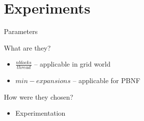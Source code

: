 \documentclass[style=unh]{powerdot}
\begin{document}

\section{Experiments}


\begin{slide}{Parameters}
  \begin{center}
    What are they?
  \end{center}
  \begin{itemize}
    \item $\frac{nblocks}{thread}$ -- applicable in grid world
    \item $min-expansions$ -- applicable for PBNF
  \end{itemize}

  \pause
  \vspace{.4in}

  \begin{center}
    How were they chosen?
  \end{center}
  \begin{itemize}
    \item Experimentation
  \end{itemize}
\end{slide}

\end{document}

